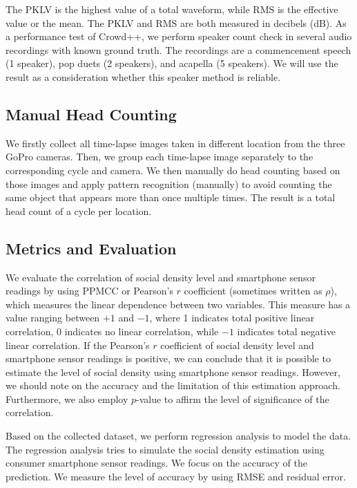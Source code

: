 The \ac{PKLV} is the highest value of a total waveform, while \ac{RMS} is the effective value or the mean. The \ac{PKLV} and \ac{RMS} are both measured in decibels (dB). As a performance test of Crowd++, we perform speaker count check in several audio recordings with known ground truth. The recordings are a commencement speech (1 speaker), pop duets (2 speakers), and acapella (5 speakers). We will use the result as a consideration whether this speaker method is reliable.

\subsection{Manual Head Counting} %
\label{sub:manual_head_counting}
We firstly collect all time-lapse images taken in different location from the three GoPro cameras. Then, we group each time-lapse image separately to the corresponding cycle and camera. We then manually do head counting based on those images and apply pattern recognition (manually) to avoid counting the same object that appears more than once multiple times. The result is a total head count of a cycle per location.
	
\subsection{Metrics and Evaluation} %
\label{sub:metrics-evaluation}
We evaluate the correlation of social density level and smartphone sensor readings by using \ac{PPMCC} or Pearson's $r$ coefficient (sometimes written as $\rho$), which measures the linear dependence between two variables. This measure has a value ranging between $+1$ and $-1$, where 1 indicates total positive linear correlation, 0 indicates no linear correlation, while $-1$ indicates total negative linear correlation. If the Pearson's $r$ coefficient of social density level and smartphone sensor readings is positive, we can conclude that it is possible to estimate the level of social density using smartphone sensor readings. However, we should note on the accuracy and the limitation of this estimation approach. Furthermore, we also employ $p$-value to affirm the level of significance of the correlation.

Based on the collected dataset, we perform regression analysis to model the data. The regression analysis tries to simulate the social density estimation using consumer smartphone sensor readings. We focus on the accuracy of the prediction. We measure the level of accuracy by using \ac{RMSE} and residual error.





